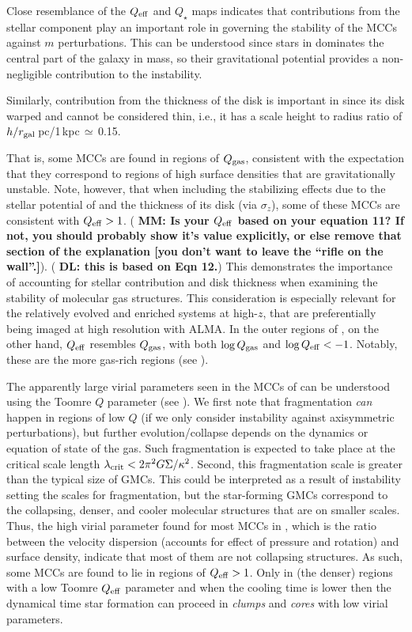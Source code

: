 \IfFileExists{emulateapjlegacy.cls}{\documentclass[iop]{emulateapjlegacy}}{\documentclass[iop]{emulateapj}}
\newcommand{\DL}[1]{({\bf \color{dlcolor} DL: #1})}
\newcommand{\MM}[1]{({\bf \color{mmcolor} MM: #1})}
\begin{document}
Close resemblance of the $Q_{\rm eff}$ and $Q_{\star}$ maps indicates that contributions from the stellar component play an important role in governing the stability of the MCCs against $m$ perturbations. This can be understood since stars in \flower dominates the central part of the galaxy in mass, so their gravitational potential provides a non-negligible contribution to the instability.

Similarly, contribution from the thickness of the disk is important in \flower since its disk warped and cannot be considered thin, i.e., 
it has a scale height to radius ratio of $h/r_{\rm gal}$\,pc/1\,kpc\,$\simeq$\,0.15.

That is, some MCCs are found in regions of $Q_{\rm gas}$, consistent with the expectation that they correspond to regions of high surface densities that are gravitationally unstable. 
Note, however, that when including the stabilizing effects due to the stellar potential of \flower and the
thickness of its disk (via $\sigma_z$), some of these MCCs are
consistent with  $Q_{\rm eff} > 1$. 
\MM{Is your $Q_{\rm eff}$ based on your equation 11?  If not, you
  should probably show it's value explicitly, or else remove that
  section of the explanation [you don't want to leave the ``rifle on
  the wall''.]}. \DL{ this is based on Eqn 12.}
This demonstrates the importance of accounting for stellar contribution and disk thickness 
when examining the stability of molecular gas structures.
This consideration is especially relevant for the relatively evolved and enriched systems at high-$z$, 
that are preferentially being imaged at high resolution with ALMA.
In the outer regions of \flower, on the other hand, $Q_{\rm eff}$ resembles $Q_{\rm gas}$, with 
both $\log{Q_{\rm gas}}$ and $\log{Q_{\rm eff}} < -1$. 
Notably, these are the more gas-rich regions (see ).

The apparently large virial parameters seen in the MCCs of \flower can be understood using the Toomre $Q$ parameter (see ). We first note that fragmentation {\it can} happen in regions of low $Q$ (if we only consider instability against axisymmetric perturbations), but further evolution/collapse depends on the dynamics or equation of state of the gas.
%
Such fragmentation is expected to take place at the critical scale length $\lambda_{\rm crit} < 2 \pi^2 G \Sigma / \kappa^2$. Second, this fragmentation scale is greater than the typical size of GMCs. This could be interpreted as a result of instability setting the scales for fragmentation, but the star-forming GMCs correspond to the collapsing, denser, and cooler molecular structures that are on smaller scales.
%
Thus, the high virial parameter found for most MCCs in \flower, which is the ratio between the velocity dispersion (accounts for effect of pressure and rotation) and surface density, indicate that most of them are not collapsing structures. As such, 
some MCCs are found to lie in regions of $Q_{\rm eff}>1$.
Only in (the denser) regions with a low Toomre $Q_{\rm eff}$ parameter and when the cooling time is lower then the dynamical time star formation can proceed in {\it clumps} and {\it cores} with low virial parameters.
\end{document}

